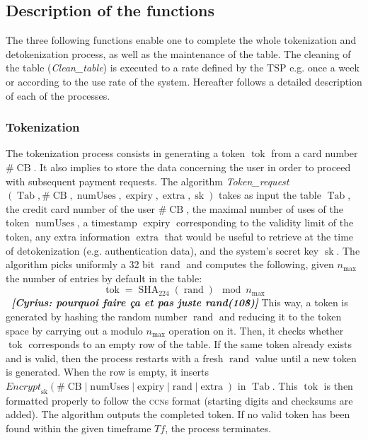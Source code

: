 \documentclass{llncs}
\DeclareMathOperator{\numUses}{numUses}
\DeclareMathOperator{\Tab}{Tab}
\DeclareMathOperator{\CB}{CB}
\DeclareMathOperator{\expiry}{expiry}
\DeclareMathOperator{\extra}{extra}
\DeclareMathOperator{\rand}{rand}
\DeclareMathOperator{\sk}{sk}
\DeclareMathOperator{\SHA}{SHA}
\DeclareMathOperator{\tok}{tok}
\newcommand{\cn}[1]{\emph{\bf \color{purple}~[Cyrius: #1]}}
\begin{document}
\subsection{Description of the functions}

The three following functions enable one to complete the whole tokenization and detokenization process, as well as the maintenance of the table. %
The cleaning of the table (\textit{Clean\_table}) is executed to a rate defined by the TSP e.g. once a week or according to the use rate of the system. Hereafter follows a detailed description of each of the processes.

\subsubsection{Tokenization}
The tokenization process consists in generating a token $\tok$ from a card number $\#\CB$. It also implies to store the data concerning the user in order to proceed with subsequent payment requests. The algorithm \textit{Token\_request}$(\Tab, \#\CB , \numUses, \expiry, \extra, \sk)$ takes as input the table $\Tab$, the credit card number of the user $\#\CB$, the maximal number of uses of the token $\numUses$, a timestamp $\expiry$ corresponding to the validity limit of the token, any extra information $\extra$ that would be useful to retrieve at the time of detokenization (e.g. authentication data), and the system's secret key $\sk$. The algorithm picks uniformly a 32 bit $\rand$ and computes the following, given $n_{\max}$ the number of entries by default in the table: 
$$\tok = \SHA_{224}(\rand) \mod n_{\max} $$
\cn{pourquoi faire ça et pas juste rand(10\^8)}
This way, a token is generated by hashing the random number $\rand$ and reducing it to the token space by carrying out a modulo $n_{\max}$ operation on it. Then, it checks whether $\tok$ corresponds to an empty row of the table. If the same token already exists and is valid, then the process restarts with a fresh $\rand$ value until a new token is generated. When the row is empty, it inserts $\textit{Encrypt}_{\sk} (\#\CB | \numUses | \expiry | \rand | \extra)$ in $\Tab$. This $\tok$ is then formatted properly to follow the \textsc{ccn}s format (starting digits and checksums are added). The algorithm outputs the completed token. If no valid token has been found within the given timeframe $Tf$, the process terminates.
\end{document}
